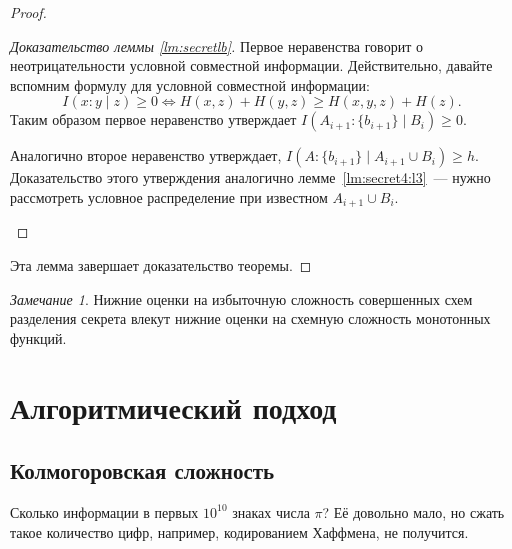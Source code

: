 \documentclass[12pt]{article}
\theoremstyle{definition}
\theoremstyle{plain}
\theoremstyle{remark}
\newtheorem{remark}{Замечание}[section]
\begin{document}
\begin{proof}
\begin{proof}[Доказательство леммы \ref{lm:secretlb}]
        Первое неравенства говорит о неотрицательности условной совместной информации.
        Действительно, давайте вспомним формулу для условной совместной информации:
        \[
            I(x:y\mid z) \ge 0 \iff H(x,z) + H(y,z)\ge H(x,y,z) + H(z).
        \]
        Таким образом первое неравенство утверждает $I(A_{i+1}:\{b_{i+1}\}\mid B_i)\ge 0$.

        Аналогично второе неравенство утверждает, $I(A:\{b_{i+1}\}\mid A_{i+1}\cup B_i)\ge h$.
        Доказательство этого утверждения аналогично лемме~\ref{lm:secret4:l3}~--- нужно рассмотреть
        условное распределение при известном $A_{i+1}\cup B_i$.
    \begin{center}
    \end{center}
    \end{proof}
    Эта лемма завершает доказательство теоремы.
\end{proof}
    \begin{remark}
        Нижние оценки на избыточную сложность совершенных схем разделения
        секрета влекут нижние оценки на схемную сложность монотонных функций.
    \end{remark}

\section{Алгоритмический подход}
\subsection{Колмогоровская сложность}
Сколько информации в первых $10^{10}$ знаках числа $\pi$? Её довольно мало,
но сжать такое количество цифр, например, кодированием Хаффмена, не
получится.
\end{document}
